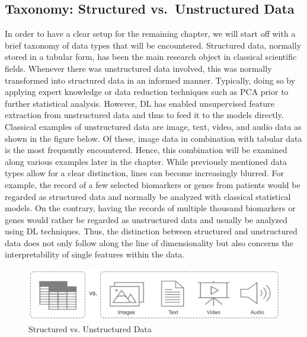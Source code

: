 \documentclass[
]{krantz}
\begin{document}
\hypertarget{taxonomy-structured-vs.-unstructured-data}{%
\subsection{Taxonomy: Structured vs.~Unstructured Data}\label{taxonomy-structured-vs.-unstructured-data}}

In order to have a clear setup for the remaining chapter, we will start off with a brief taxonomy of data types that will be encountered. Structured data, normally stored in a tabular form, has been the main research object in classical scientific fields. Whenever there was unstructured data involved, this was normally transformed into structured data in an informed manner. Typically, doing so by applying expert knowledge or data reduction techniques such as PCA prior to further statistical analysis. However, DL has enabled unsupervised feature extraction from unstructured data and thus to feed it to the models directly. Classical examples of unstructured data are image, text, video, and audio data as shown in the figure below. Of these, image data in combination with tabular data is the most frequently encountered. Hence, this combination will be examined along various examples later in the chapter. While previously mentioned data types allow for a clear distinction, lines can become increasingly blurred. For example, the record of a few selected biomarkers or genes from patients would be regarded as structured data and normally be analyzed with classical statistical models. On the contrary, having the records of multiple thousand biomarkers or genes would rather be regarded as unstructured data and usually be analyzed using DL techniques. Thus, the distinction between structured and unstructured data does not only follow along the line of dimensionality but also concerns the interpretability of single features within the data.

\begin{figure}

{\centering \includegraphics[width=1\linewidth]{figures/03-02-struc+unstruc-data/Struct_vs_Unstruct_Data} 

}

\caption{Structured vs. Unstructured Data}\label{fig:struc-vs-unstrc}
\end{figure}
\end{document}
